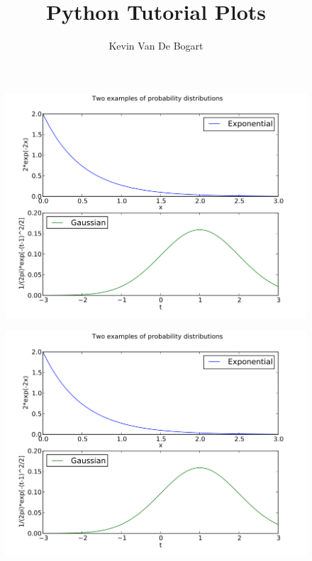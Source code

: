 \documentclass{article}
\title{Python Tutorial Plots}
\author{Kevin Van De Bogart}
\begin{document}
\maketitle

\begin{figure}
\centering
\includegraphics[width=1\linewidth]{example1.png}
\end{figure}

\begin{figure}
\centering
\includegraphics[width=1\linewidth]{example1.png}
\end{figure}
\end{document}
